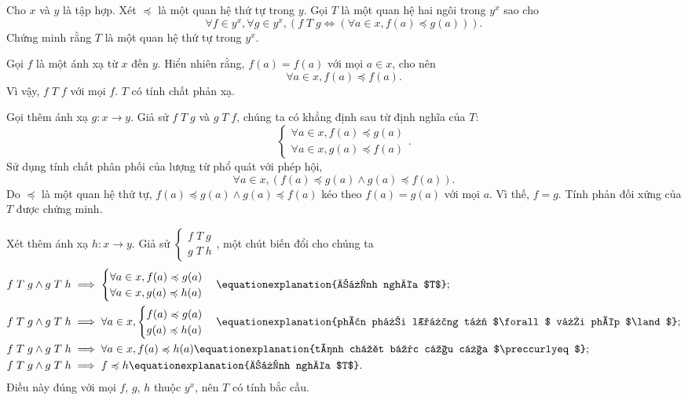 \exercise Cho $x$ và $y$ là tập hợp. Xét $\preccurlyeq$ là một quan hệ thứ tự trong $y$. Gọi $T$ là một quan hệ hai ngôi trong $y^x$ sao cho 
\begin{equation*}
   \forall f \in y^x, \forall g \in y^x, \left(f\;T\;g \iff (\forall a \in x, f(a) \preccurlyeq g(a))\right).
\end{equation*} 
Chứng minh rằng $T$ là một quan hệ thứ tự trong $y^x$.

\solution

Gọi $f$ là một ánh xạ từ $x$ đến $y$. Hiển nhiên rằng, $f(a) = f(a)$ với mọi $a \in x$, cho nên \begin{equation*}
   \forall a \in x, f(a) \preccurlyeq f(a).
\end{equation*}
Vì vậy, $f\;T\;f$ với mọi $f$. $T$ có tính chất phản xạ.

Gọi thêm ánh xạ $g: x \to y$. Giả sử $f\;T\;g$ và $g\;T\;f$, chúng ta có khẳng định sau từ định nghĩa của $T$:
\begin{equation*}
   \begin{cases}
      \forall a \in x, f(a) \preccurlyeq g(a) \\
      \forall a \in x, g(a) \preccurlyeq f(a)
   \end{cases}.
\end{equation*}
Sử dụng tính chất phân phối của lượng từ phổ quát với phép hội,
\begin{equation*}
   \forall a \in x, (f(a) \preccurlyeq g(a) \land g(a) \preccurlyeq f(a)).
\end{equation*}
Do $\preccurlyeq$ là một quan hệ thứ tự, $f(a) \preccurlyeq g(a) \land g(a) \preccurlyeq f(a)$ kéo theo $f(a) = g(a)$ với mọi $a$. Vì thế, $f = g$. Tính phản đối xứng của $T$ được chứng minh.

Xét thêm ánh xạ $h: x \to y$. Giả sử $\begin{cases}
   f\;T\;g \\
   g\;T\;h
\end{cases}$, một chút biến đổi cho chúng ta \begin{align*}
   f\;T\;g \land g\;T\;h &\implies \begin{cases}
      \forall a \in x, f(a) \preccurlyeq g(a) \\
      \forall a \in x, g(a) \preccurlyeq h(a)
   \end{cases} \equationexplanation{định nghĩa $T$}; \\
   f\;T\;g \land g\;T\;h &\implies \forall a \in x, \begin{cases}
      f(a) \preccurlyeq g(a) \\
      g(a) \preccurlyeq h(a)
   \end{cases} \equationexplanation{phân phối lượng từ $\forall$ với phép $\land$};\\
   f\;T\;g \land g\;T\;h &\implies \forall a \in x, f(a) \preccurlyeq h(a) \equationexplanation{tính chất bắc cầu của $\preccurlyeq$}; \\
   f\;T\;g \land g\;T\;h &\implies f \preccurlyeq h \equationexplanation{định nghĩa $T$}.
\end{align*}
Điều này đúng với mọi $f$, $g$, $h$ thuộc $y^x$, nên $T$ có tính bắc cầu.


